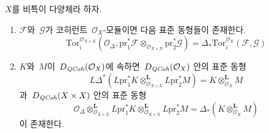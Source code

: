 \begin{lemma}
\label{lemma-tor-and-diagonal}
$X$를 비특이 다양체라 하자.
\begin{enumerate}
\item $\mathcal{F}$와\  $\mathcal{G}$가 코히런트\  $\mathcal{O}_X$-모듈이면
다음 표준 동형들이 존재한다.
$$
\text{Tor}_i^{\mathcal{O}_{X \times X}}(\mathcal{O}_\Delta,
\text{pr}_1^*\mathcal{F} \otimes_{\mathcal{O}_{X \times X}}
\text{pr}_2^*\mathcal{G})
=
\Delta_*\text{Tor}_i^{\mathcal{O}_X}(\mathcal{F}, \mathcal{G})
$$
\item $K$와\  $M$이\  $D_{\mathit{QCoh}}(\mathcal{O}_X)$에 속하면\ 
$D_{\mathit{QCoh}}(\mathcal{O}_X)$ 안의 표준 동형
$$
L\Delta^* \left(
L\text{pr}_1^*K \otimes_{\mathcal{O}_{X \times X}}^\mathbf{L} L\text{pr}_2^*M
\right)
= K \otimes_{\mathcal{O}_X}^\mathbf{L} M
$$
과\  $D_{\mathit{QCoh}}(X \times X)$ 안의 표준 동형
$$
\mathcal{O}_\Delta \otimes_{\mathcal{O}_{X \times X}}^\mathbf{L}
L\text{pr}_1^*K \otimes_{\mathcal{O}_{X \times X}}^\mathbf{L} L\text{pr}_2^*M
= \Delta_*(K \otimes_{\mathcal{O}_X}^\mathbf{L} M)
$$
이 존재한다.
\end{enumerate}
\end{lemma}

